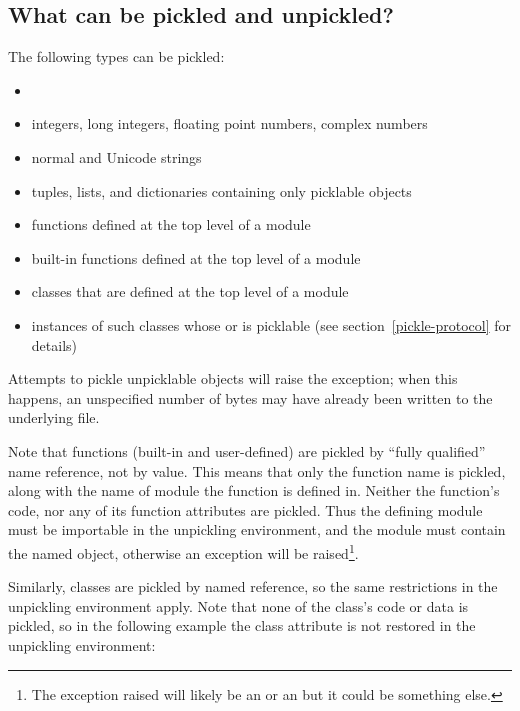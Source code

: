 \subsection{What can be pickled and unpickled?}

The following types can be pickled:

\begin{itemize}

\item {}

\item integers, long integers, floating point numbers, complex numbers

\item normal and Unicode strings

\item tuples, lists, and dictionaries containing only picklable objects

\item functions defined at the top level of a module

\item built-in functions defined at the top level of a module

\item classes that are defined at the top level of a module

\item instances of such classes whose  or
 is picklable  (see
section~\ref{pickle-protocol} for details)

\end{itemize}

Attempts to pickle unpicklable objects will raise the
 exception; when this happens, an unspecified
number of bytes may have already been written to the underlying file.

Note that functions (built-in and user-defined) are pickled by ``fully
qualified'' name reference, not by value.  This means that only the
function name is pickled, along with the name of module the function
is defined in.  Neither the function's code, nor any of its function
attributes are pickled.  Thus the defining module must be importable
in the unpickling environment, and the module must contain the named
object, otherwise an exception will be raised\footnote{The exception
raised will likely be an  or an
 but it could be something else.}.

Similarly, classes are pickled by named reference, so the same
restrictions in the unpickling environment apply.  Note that none of
the class's code or data is pickled, so in the following example the
class attribute  is not restored in the unpickling
environment:

